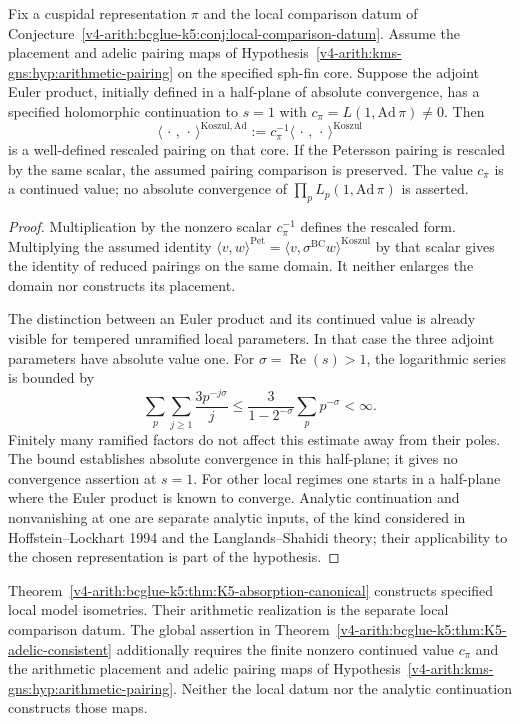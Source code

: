 \begin{theorem}
\label{v4-arith:bcglue-k5:thm:K5-adelic-consistent}
Fix a cuspidal representation \(\pi\) and the local comparison datum
of Conjecture~\ref{v4-arith:bcglue-k5:conj:local-comparison-datum}.
Assume the placement and adelic pairing maps of
Hypothesis~\ref{v4-arith:kms-gns:hyp:arithmetic-pairing} on the
specified sph-fin core. Suppose the adjoint Euler product, initially
defined in a half-plane of absolute convergence, has a specified
holomorphic continuation to \(s=1\) with
\(c_\pi=L(1,\mathrm{Ad}\,\pi)\ne0\).
Then
\[
 \langle\,\cdot\,,\,\cdot\,\rangle^{\mathrm{Koszul,Ad}}
 :=c_\pi^{-1}\langle\,\cdot\,,\,\cdot\,\rangle^{\mathrm{Koszul}}
\]
is a well-defined rescaled pairing on that core. If the Petersson
pairing is rescaled by the same scalar, the assumed pairing
comparison is preserved. The value \(c_\pi\) is a continued value;
no absolute convergence of \(\prod_pL_p(1,\mathrm{Ad}\,\pi)\)
is asserted.
\end{theorem}
\begin{proof}
Multiplication by the nonzero scalar \(c_\pi^{-1}\) defines the
rescaled form. Multiplying the assumed identity
\(\langle v,w\rangle^{\mathrm{Pet}}=
\langle v,\sigma^{\mathrm{BC}}w\rangle^{\mathrm{Koszul}}\)
by that scalar gives the identity of reduced pairings on the same
domain. It neither enlarges the domain nor constructs its placement.

The distinction between an Euler product and its continued value is
already visible for tempered unramified local parameters. In that
case the three adjoint parameters have absolute value one. For
\(\sigma=\operatorname{Re}(s)>1\), the logarithmic series is bounded by
\[
 \sum_p\sum_{j\geq1}\frac{3p^{-j\sigma}}{j}
 \leq\frac{3}{1-2^{-\sigma}}\sum_p p^{-\sigma}<\infty.
\]
Finitely many ramified factors do not affect this estimate away from
their poles. The bound establishes absolute convergence in this
half-plane; it gives no convergence assertion at \(s=1\).
For other local regimes one starts in a half-plane where the Euler
product is known to converge. Analytic continuation and nonvanishing
at one are separate analytic inputs, of the kind considered in
Hoffstein--Lockhart 1994 and the Langlands--Shahidi theory; their
applicability to the chosen representation is part of the hypothesis.
\end{proof}

\begin{remark}
\label{v4-arith:bcglue-k5:rem:K5-delta}
Theorem~\ref{v4-arith:bcglue-k5:thm:K5-absorption-canonical}
constructs specified local model isometries. Their arithmetic
realization is the separate local comparison datum.
The global assertion in
Theorem~\ref{v4-arith:bcglue-k5:thm:K5-adelic-consistent}
additionally requires the finite nonzero continued value \(c_\pi\)
and the arithmetic placement and adelic pairing maps of
Hypothesis~\ref{v4-arith:kms-gns:hyp:arithmetic-pairing}.
Neither the local datum nor the analytic continuation constructs those maps.
\end{remark}

